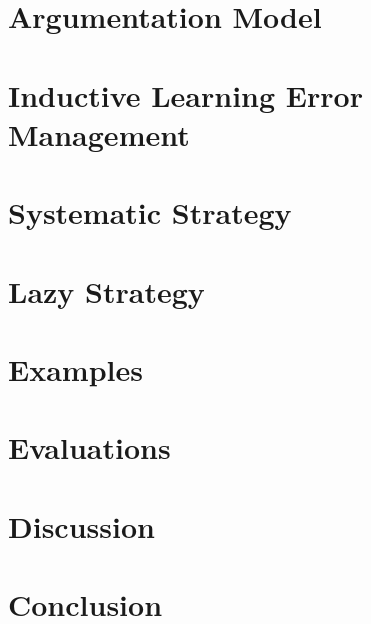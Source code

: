 \documentclass{report}
\begin{document}
\chapter{Argumentation Model}\label{ArgumentationModel}


\chapter{Inductive Learning Error Management}\label{ErrorManagement}


\chapter{Systematic Strategy}\label{SystematicStrategy}


\chapter{Lazy Strategy}\label{LazyStrategy}


\chapter{Examples}\label{Examples}


\chapter{Evaluations}\label{Evaluations}


\chapter{Discussion}\label{Discussion}


\chapter{Conclusion}\label{Conclusion}

\end{document}
